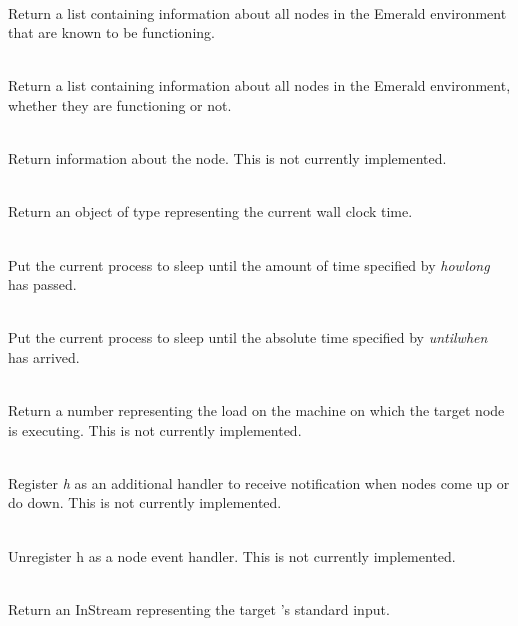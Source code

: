 \begin{desc}
  \item[\kw{operation} getActiveNodes \returns{} \/\LB{}NodeList\/\RB{}]~\\
    Return a list containing information about all nodes in the Emerald
    environment that are known to be functioning.
  \item[\kw{operation} getAllNodes \returns{} \/\LB{}NodeList\/\RB{}]~\\
    Return a list containing information about all nodes in the Emerald
    environment, whether they are functioning or not.
  \item[\kw{operation} getNodeInformation \returns{} \/\LB{}NodeListElement\/\RB{}]~\\
    Return information about the node.  This is not currently implemented.
  \item[\kw{operation} getTimeOfDay \returns{} \/\LB{}Time\/\RB{}]~\\
    Return an object of type  representing the current wall clock
    time.
  \item[\kw{operation} delay\/\LB{}howlong \CO{} Time\/\RB{}]~\\
    Put the current process to sleep until the amount of time specified by
    {\it howlong} has passed.
  \item[\kw{operation} waitUntil\/\LB{}untilwhen \CO{} Time\/\RB{}]~\\
    Put the current process to sleep until the absolute time specified by
    {\it untilwhen} has arrived.
  \item[\kw{operation} getLoadAverage \returns{} \/\LB{}\tn{Real}\/\RB{}]~\\
    Return a  number representing the load on the machine on which
    the target node is executing.  This is not currently implemented.
  \item[\kw{operation} setNodeEventHandler\/\LB{}h \CO{} HandlerType\/\RB{}]~\\
    Register {\it h} as an additional handler to receive notification when
    nodes come up or do down.  This is not currently implemented.
  \item[\kw{operation} removeNodeEventHandler\/\LB{}h \CO{} HandlerType\/\RB{}]~\\
    Unregister h as a node event handler.  This is not currently implemented.
  \item[\kw{operation} getStdin \returns{} \/\LB{}InStream\/\RB{}]~\\
    Return an InStream representing the target 's standard input.

\end{desc}
